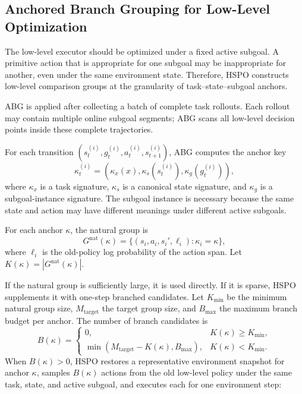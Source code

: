 \documentclass{article}
\newcommand{\wei}[1]{\textcolor{red}{#1}}
\begin{document}
\subsection{Anchored Branch Grouping for Low-Level Optimization} %

The low-level executor should be optimized under a fixed active subgoal. A primitive action that is appropriate for one subgoal may be inappropriate for another, even under the same environment state. Therefore, HSPO constructs low-level comparison groups at the granularity of task--state--subgoal anchors.

ABG is applied after collecting a batch of complete task rollouts. Each rollout may contain multiple online subgoal segments; ABG scans all low-level decision points inside these complete trajectories.

For each transition $(s_t^{(i)},g_t^{(i)},a_t^{(i)},s_{t+1}^{(i)})$, ABG computes the anchor key
\begin{equation}
\kappa_t^{(i)}
=
(\kappa_x(x),\kappa_s(s_t^{(i)}),\kappa_g(g_t^{(i)})),
\label{eq:anchor}
\end{equation}
where $\kappa_x$ is a task signature, $\kappa_s$ is a canonical state signature, and $\kappa_g$ is a subgoal-instance signature. The subgoal instance is necessary because the same state and action may have different meanings under different active subgoals.

For each anchor $\kappa$, the natural group is
\begin{equation}
G^{\mathrm{nat}}(\kappa)
=
\{(s_i,a_i,s_i',\ell_i):\kappa_i=\kappa\},
\label{eq:natural_group}
\end{equation}
where $\ell_i$ is the old-policy log probability of the action span. Let $K(\kappa)=|G^{\mathrm{nat}}(\kappa)|$.

If the natural group is sufficiently large, it is used directly. If it is sparse, HSPO supplements it with one-step branched candidates. Let $K_{\min}$ be the minimum natural group size, $M_{\mathrm{target}}$ the target group size, and $B_{\max}$ the maximum branch budget per anchor. The number of branch candidates is
\begin{equation}
B(\kappa)
=
\begin{cases}
0, & K(\kappa)\geq K_{\min},\\
\min(M_{\mathrm{target}}-K(\kappa),B_{\max}), & K(\kappa)<K_{\min}.
\end{cases}
\label{eq:branch_budget}
\end{equation}
When $B(\kappa)>0$, HSPO restores a representative environment snapshot for anchor $\kappa$, samples $B(\kappa)$ actions from the old low-level policy under the same task, state, and active subgoal, and executes each for one environment step:
\end{document}
